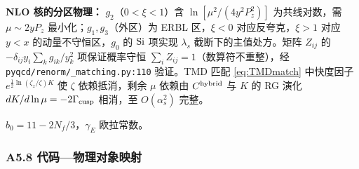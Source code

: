 \documentclass[UTF8]{ctexart}
\begin{document}
\begin{keybox}
\textbf{NLO 核的分区物理：}
$g_2$（$0<\xi<1$）含 $\ln[\mu^2/(4y^2P_z^2)]$ 为共线对数，需 $\mu\sim2yP_z$ 最小化；$g_1,g_3$（外区）为 ERBL 区，$\xi<0$ 对应反夸克，$\xi>1$ 对应 $y<x$ 的动量不守恒区，$g_0$ 的 ${\rm Si}$ 项实现 $\lambda_s$ 截断下的主值处方。矩阵 $Z_{ij}$ 的 $-\delta_{ij}y_i\sum_k g_{ik}/y_k^2$ 项保证概率守恒 $\sum_i Z_{ij}=1$（数算符不重整），经 \texttt{\nolinkurl{pyqcd/renorm/\_matching.py:110}} 验证。TMD 匹配 \eqref{eq:TMDmatch} 中快度因子 $e^{\frac12\ln(\zeta_z/\zeta)K}$ 使 $\zeta$ 依赖抵消，剩余 $\mu$ 依赖由 $C^{\rm hybrid}$ 与 $K$ 的 RG 演化 $dK/d\ln\mu=-2\Gamma_{\rm cusp}$ 相消，至 $O(\alpha_s^2)$ 完整。
\end{keybox}

$b_0=11-2N_f/3$，$\gamma_E$ 欧拉常数。

\subsubsection{A5.8 代码—物理对象映射}
\small
\end{document}
